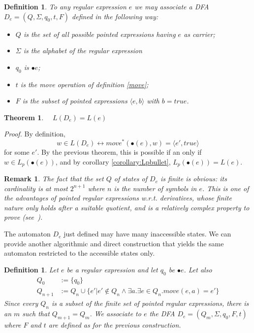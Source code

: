 \documentclass[preprint]{sigplanconf}
\newcommand{\true}{\mathit{true}}
\newcommand{\Le}[1]{L(#1)}
\newcommand{\Lp}[1]{L_p(#1)}
\newcounter{item}
\newtheorem{theorem}[item]{Theorem}
\newtheorem{definition}[item]{Definition}
\newtheorem{remark}[item]{Remark}
\newenvironment{proof}{\begin{trivlist}\item[]{\em Proof.}}{\end{trivlist}}
\begin{document}
\begin{definition}
To any regular expression $e$ we may associate a DFA 
$D_e = (Q,\Sigma,q_0,t,F)$ 
defined in the following way:
\begin{itemize}
\item $Q$ is the set of all possible pointed expressions having $e$ as
carrier;
\item $\Sigma$ is the alphabet of the regular expression
\item $q_0$ is $\bullet e$;
\item $t$ is the move operation of definition \ref{move};
\item $F$ is the subset of pointed expressions $\langle e, b \rangle$ 
with $b = \true$.
\end{itemize}
\end{definition}

\begin{theorem} 
\label{theo:main}
$\quad L(D_e) = \Le e$
\end{theorem}
 \begin{proof}
By definition, 
\[w \in L(D_e) \leftrightarrow move^*(\bullet(e), w) = \langle e',true \rangle\]
for some $e'$. By the previous theorem, this is possible if an only if
$w \in \Lp{\bullet(e)}$, and by corollary \ref{corollary:Lpbullet}, 
$\Lp{\bullet(e)} = \Le e$.
\end{proof}


\begin{remark}\label{card}The fact that the set $Q$ of states of $D_e$ 
is finite is obvious: its cardinality is at most $2^{n+1}$ where $n$ is 
the number of symbols in $e$. This is one of the advantages
of pointed regular expressions w.r.t. derivatives, whose finite
nature only holds after a suitable quotient, and is a relatively
complex property to prove (see~\cite{Brzozowski64}).
\end{remark} 

\noindent
The automaton $D_e$ just defined may have many inaccessible states. We can
provide another algorithmic and direct construction that yields the same
automaton restricted to the accessible states only.

\begin{definition}\label{algorithmic1}
Let $e$ be a regular expression and let $q_0$ be $\bullet e$.
Let also
 $$\begin{array}{ll}Q_0 & := \{ q_0 \}\\
   Q_{n+1} & := Q_n \cup \{ e' | e' \not\in Q_n \land \exists a.\exists e \in Q_n. move(e,a) = e'\}\end{array}$$
 Since every $Q_n$ is a subset of the finite set of pointed regular expressions, there is an $m$ such that $Q_{m+1} = Q_m$.
We associate to $e$ the DFA $D_e = (Q_m,\Sigma,q_0,F,t)$ where $F$ and $t$
are defined as for the previous construction.
\end{definition}
\end{document}
